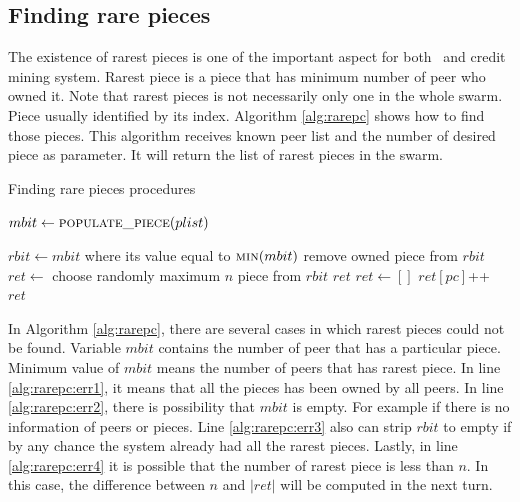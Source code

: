 \subsection{Finding rare pieces}
The existence of rarest pieces is one of the important aspect for both \bt~and credit mining system. Rarest piece is a piece that has minimum number of peer who owned it. Note that rarest pieces is not necessarily only one in the whole swarm. Piece usually identified by its index. Algorithm \ref{alg:rarepc} shows how to find those pieces. This algorithm receives known peer list and the number of desired piece as parameter. It will return the list of rarest pieces in the swarm. 

\begin{algorithm}[h]
	\caption{Finding rare pieces procedures}
	\label{alg:rarepc}
	\begin{algorithmic}[1]
		
		\State $mbit \gets \Call{populate\_piece}{plist}$
		
			\State \Return [] \label{alg:rarepc:err1}
		\EndIf
		\State $rbit \gets mbit$ where its value equal to $\Call{min}{mbit}$ \label{alg:rarepc:err2}
		\State remove owned piece from $rbit$ \label{alg:rarepc:err3}
		\State $ret \gets$ choose randomly maximum $n$ piece from $rbit$ \label{alg:rarepc:err4}
		\State \Return $ret$
		\EndFunction
		\Statex
		\makeatletter\setcounter{ALG@line}{0}\makeatother
		\State $ret \gets []$
		\State $ret[pc]$++
		\EndFor
		\EndFor
		\State \Return $ret$
		\EndFunction
	\end{algorithmic}
\end{algorithm}

In Algorithm \ref{alg:rarepc}, there are several cases in which rarest pieces could not be found. Variable $mbit$ contains the number of peer that has a particular piece. Minimum value of $mbit$ means the number of peers that has rarest piece. In line \ref{alg:rarepc:err1}, it means that all the pieces has been owned by all peers. In line \ref{alg:rarepc:err2}, there is  possibility that $mbit$ is empty. For example if there is no information of peers or pieces. Line \ref{alg:rarepc:err3} also can strip $rbit$ to empty if by any chance the system already had all the rarest pieces. Lastly, in line \ref{alg:rarepc:err4} it is possible that the number of rarest piece is less than $n$. In this case, the difference between $n$ and $|ret|$ will be computed in the next turn. 

